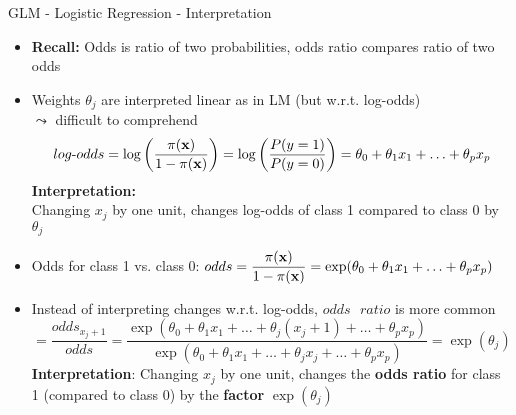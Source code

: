 \documentclass[11pt,compress,t,notes=noshow, aspectratio=169, xcolor=table]{beamer}
\begin{document}
\begin{frame}[c]{GLM - Logistic Regression - Interpretation}

    \begin{itemize}
        \item \textbf{Recall:} Odds is ratio of two probabilities, odds ratio compares ratio of two odds 
        \item Weights $\theta_j$ are interpreted linear as in LM (but w.r.t. log-odds) \\
        $\leadsto$ difficult to comprehend
        $$log\text{-}odds = \log \left(\frac{\pi(\mathbf{x})}{1 - \pi(\mathbf{x})}\right) = \log \left(\frac{P(y=1)}{P(y=0)}\right) = \theta_0 + \theta_1 x_1 + \ldots + \theta_p x_p  $$
        \textbf{Interpretation:} \\ Changing $x_j$ by one unit, changes log-odds of class 1 compared to class 0 by $\theta_j$%
        \pause
        \item Odds for class 1 vs. class 0: %
        $odds = \displaystyle\frac{\pi(\mathbf{x})}{1 - \pi(\mathbf{x})}= \exp(\theta_0 + \theta_1 x_1 + \ldots + \theta_p x_p)$
        \item Instead of interpreting changes w.r.t. log-odds,  $odds\text{ }ratio$ is more common
        $$ = \frac{odds_{x_j+1}}{odds} = \frac{\exp(\theta_0 + \theta_1 x_1 + \ldots + \theta_j (x_j+1) + \ldots + \theta_p x_p)}{\exp(\theta_0 + \theta_1 x_1 + \ldots + \theta_j x_j + \ldots + \theta_p x_p)} = \exp{(\theta_j)} $$
        \textbf{Interpretation}: Changing $x_j$ by one unit, changes the \textbf{odds ratio} for class 1 (compared to class 0) by the \textbf{factor} $\exp(\theta_j)$
    \end{itemize}	

\end{frame}
\end{document}
